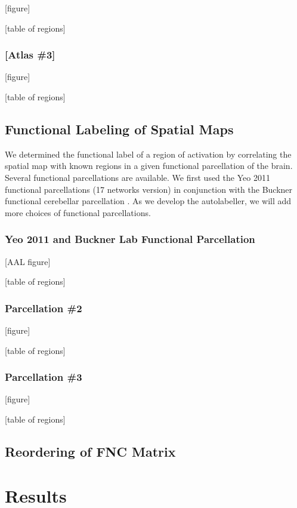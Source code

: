 \documentclass{article}
\begin{document}
[figure]

[table of regions]

\subsubsection{[Atlas \#3]}

[figure]

[table of regions]

\subsection{Functional Labeling of Spatial Maps}

We determined the functional label of a region of activation by correlating the spatial map with known regions in a given functional parcellation of the brain.
Several functional parcellations are available.
We first used the Yeo 2011 functional parcellations (17 networks version) in conjunction with the Buckner functional cerebellar parcellation \citep{b3,b4}.
As we develop the autolabeller, we will add more choices of functional parcellations.

\subsubsection{Yeo 2011 and Buckner Lab Functional Parcellation}

[AAL figure]

[table of regions]

\subsubsection{Parcellation \#2}

[figure]

[table of regions]

\subsubsection{Parcellation \#3}

[figure]

[table of regions]

\subsection{Reordering of FNC Matrix}

\section{Results}
\end{document}
